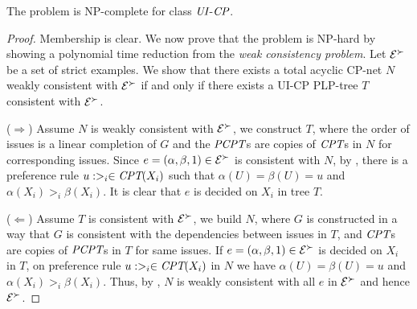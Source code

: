 \begin{thm}
	The  problem is NP-complete for class $\textit{UI}$-$\textit{CP}$.
\end{thm}
\begin{proof}
	Membership is clear. We now prove that the problem is NP-hard by showing a polynomial
	time reduction from the \emph{weak consistency problem}.
	Let $\mathcal{E}^\succ$ be a set of strict examples.  We show that there exists a
	total acyclic CP-net $N$ weakly consistent with $\mathcal{E}^\succ$ if and only if
	there exists a UI-CP PLP-tree $T$ consistent with $\mathcal{E}^\succ$.

	($\Rightarrow$) Assume $N$ is weakly consistent with $\mathcal{E}^\succ$, we
	construct $T$, where the order of issues is a linear completion of $G$
	and the $\textit{PCPT}$s are copies of $\textit{CPT}$s in $N$ for corresponding issues.
	Since $e=(\alpha,\beta,1) \in \mathcal{E}^\succ$ is consistent with $N$, by , there is a preference
	rule $u:>_i \in \textit{CPT}(X_i)$ such that $\alpha(U)=\beta(U)=u$ and $\alpha(X_i) >_i \beta(X_i)$.
	It is clear that $e$ is decided on $X_i$ in tree $T$.

	($\Leftarrow$) Assume $T$ is consistent with $\mathcal{E}^\succ$, we build $N$, where
	$G$ is constructed in a way that $G$ is consistent with the dependencies between issues
	in $T$, and $\textit{CPT}$s are copies of $\textit{PCPT}$s in $T$ for same issues.
	If $e=(\alpha,\beta,1) \in \mathcal{E}^\succ$ is decided on $X_i$ in $T$, on preference rule
	$u:>_i \in \textit{CPT}(X_i)$ in $N$ we have $\alpha(U)=\beta(U)=u$ and $\alpha(X_i) >_i \beta(X_i)$.
	Thus, by , $N$ is weakly consistent with all $e$ in $\mathcal{E}^\succ$ and hence $\mathcal{E}^\succ$.
\end{proof}

